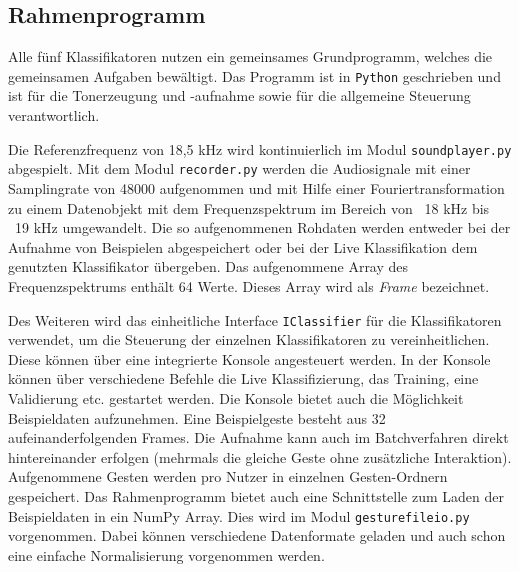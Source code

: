 \subsection{Rahmenprogramm}
\label{sec:app}
Alle fünf Klassifikatoren nutzen ein gemeinsames Grundprogramm, welches die
gemeinsamen Aufgaben bewältigt. Das Programm ist in \texttt{Python} geschrieben
und ist für die Tonerzeugung und -aufnahme sowie für die allgemeine Steuerung
verantwortlich. 

Die Referenzfrequenz von 18,5 kHz wird kontinuierlich im Modul
\texttt{soundplayer.py} abgespielt. Mit dem Modul \texttt{recorder.py} werden
die Audiosignale mit einer Samplingrate von 48000 aufgenommen und mit Hilfe einer
Fouriertransformation zu einem Datenobjekt mit dem Frequenzspektrum im Bereich
von ~18 kHz bis ~19 kHz umgewandelt. Die so aufgenommenen Rohdaten werden
entweder bei der Aufnahme von Beispielen abgespeichert oder bei der Live
Klassifikation dem genutzten Klassifikator übergeben. Das aufgenommene Array des
Frequenzspektrums enthält 64 Werte. Dieses Array wird als \textit{Frame}
bezeichnet.

Des Weiteren wird das einheitliche Interface \texttt{IClassifier} für die
Klassifikatoren verwendet, um die Steuerung der einzelnen Klassifikatoren zu
vereinheitlichen. Diese können über eine integrierte Konsole angesteuert werden.
In der Konsole können über verschiedene Befehle die Live Klassifizierung, das
Training, eine Validierung etc. gestartet werden.
\enlargethispage{\baselineskip}
Die Konsole bietet auch die Möglichkeit Beispieldaten aufzunehmen. Eine
Beispielgeste besteht aus 32 aufeinanderfolgenden Frames. Die Aufnahme kann auch
im Batchverfahren direkt hintereinander erfolgen (mehrmals die gleiche Geste
ohne zusätzliche Interaktion). Aufgenommene Gesten werden pro Nutzer in
einzelnen Gesten-Ordnern gespeichert. Das Rahmenprogramm bietet auch eine
Schnittstelle zum Laden der Beispieldaten in ein NumPy Array. Dies wird im Modul
\texttt{gesturefileio.py} vorgenommen. Dabei können verschiedene Datenformate
geladen und auch schon eine einfache Normalisierung vorgenommen werden.


